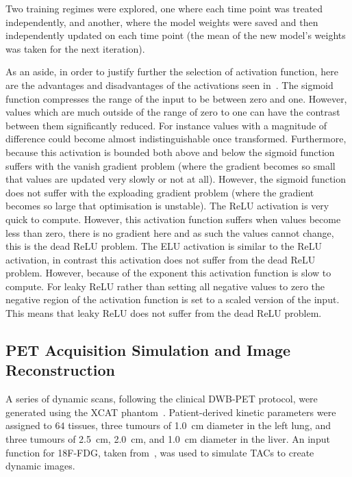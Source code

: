             Two training regimes were explored, one where each time point was treated independently, and another, where the model weights were saved and then independently updated on each time point (the mean of the new model's weights was taken for the next iteration).

            As an aside, in order to justify further the selection of activation function, here are the advantages and disadvantages of the activations seen in~. The sigmoid function compresses the range of the input to be between zero and one. However, values which are much outside of the range of zero to one can have the contrast between them significantly reduced. For instance values with a magnitude of difference could become almost indistinguishable once transformed. Furthermore, because this activation is bounded both above and below the sigmoid function suffers with the vanish gradient problem (where the gradient becomes so small that values are updated very slowly or not at all). However, the sigmoid function does not suffer with the exploading gradient problem (where the gradient becomes so large that optimisation is unstable). The \gls{ReLU} activation is very quick to compute. However, this activation function suffers when values become less than zero, there is no gradient here and as such the values cannot change, this is the dead \gls{ReLU} problem. The \gls{ELU} activation is similar to the \gls{ReLU} activation, in contrast this activation does not suffer from the dead \gls{ReLU} problem. However, because of the exponent this activation function is slow to compute. For leaky \gls{ReLU} rather than setting all negative values to zero the negative region of the activation function is set to a scaled version of the input. This means that leaky \gls{ReLU} does not suffer from the dead \gls{ReLU} problem.
        
        \subsection{PET Acquisition Simulation and Image Reconstruction} \label{sec:pseudo_bayesian_dip_denoising_as_a_preprocessing_step_for_kinetic_modelling_in_dynamic_pet_appendix_methods_pet_acquisition_simulation_and_image_reconstruction}
            A series of dynamic scans, following the clinical \gls{DWB}-\gls{PET} protocol, were generated using the \gls{XCAT} phantom~\parencite{Segars2010}. Patient-derived kinetic parameters were assigned to $64$ tissues, three tumours of \SI{1.0}{\centi\meter} diameter in the left lung, and three tumours of \SI{2.5}{\centi\meter}, \SI{2.0}{\centi\meter}, and \SI{1.0}{\centi\meter} diameter in the liver. An input function for \gls{18F-FDG}, taken from~\parencite{Langsjo2004EffectsHumans}, was used to simulate \glspl{TAC} to create dynamic images.
    
